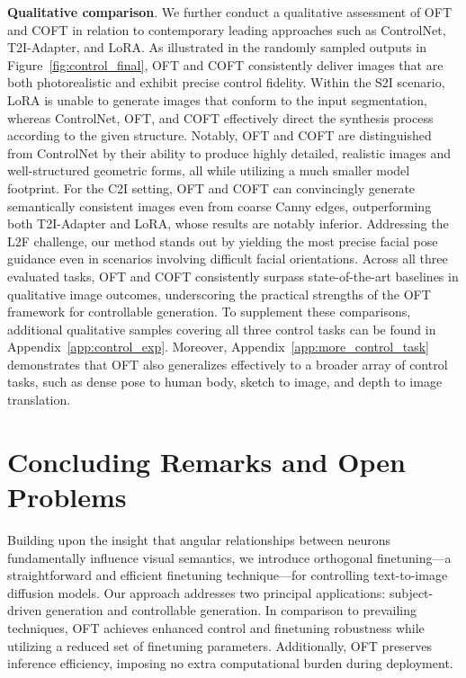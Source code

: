 {\textbf{Qualitative comparison}. We further conduct a qualitative assessment of OFT and COFT in relation to contemporary leading approaches such as ControlNet, T2I-Adapter, and LoRA. As illustrated in the randomly sampled outputs in Figure~\ref{fig:control_final}, OFT and COFT consistently deliver images that are both photorealistic and exhibit precise control fidelity. Within the S2I scenario, LoRA is unable to generate images that conform to the input segmentation, whereas ControlNet, OFT, and COFT effectively direct the synthesis process according to the given structure. Notably, OFT and COFT are distinguished from ControlNet by their ability to produce highly detailed, realistic images and well-structured geometric forms, all while utilizing a much smaller model footprint. For the C2I setting, OFT and COFT can convincingly generate semantically consistent images even from coarse Canny edges, outperforming both T2I-Adapter and LoRA, whose results are notably inferior. Addressing the L2F challenge, our method stands out by yielding the most precise facial pose guidance even in scenarios involving difficult facial orientations. Across all three evaluated tasks, OFT and COFT consistently surpass state-of-the-art baselines in qualitative image outcomes, underscoring the practical strengths of the OFT framework for controllable generation. To supplement these comparisons, additional qualitative samples covering all three control tasks can be found in Appendix~\ref{app:control_exp}. Moreover, Appendix~\ref{app:more_control_task} demonstrates that OFT also generalizes effectively to a broader array of control tasks, such as dense pose to human body, sketch to image, and depth to image translation.

\section{Concluding Remarks and Open Problems}

Building upon the insight that angular relationships between neurons fundamentally influence visual semantics, we introduce orthogonal finetuning—a straightforward and efficient finetuning technique—for controlling text-to-image diffusion models. Our approach addresses two principal applications: subject-driven generation and controllable generation. In comparison to prevailing techniques, OFT achieves enhanced control and finetuning robustness while utilizing a reduced set of finetuning parameters. Additionally, OFT preserves inference efficiency, imposing no extra computational burden during deployment.

}
